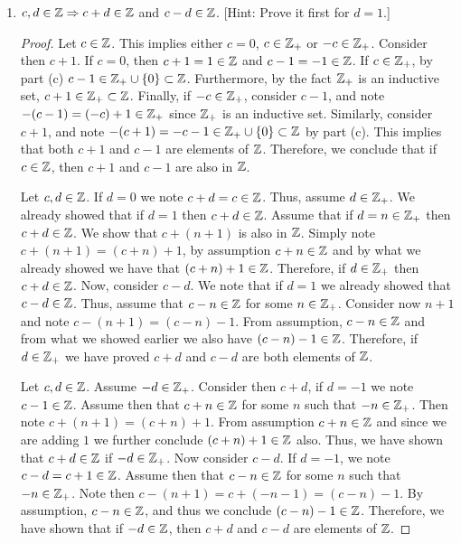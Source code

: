 \documentclass[12pt]{article}
\begin{document}
\begin{enumerate}[label=(\alph*)]
\begin{proof}
			Therefore, if $a \in \ZZ_{+}$, it must be $a \in X$. Thus, for $a \in \ZZ_{+}$ we conclude
			$a - 1 \in \ZZ_{+} \cup \{0\}$. 
		\end{proof}
		\item $c, d \in \mathbb{Z} \Rightarrow c + d \in \mathbb{Z}$ and $c - d \in \mathbb{Z}$. [Hint: Prove it first for $d = 1$.]
		\begin{proof}
			Let $c \in \mathbb{Z}$. This implies either $c = 0$, $c \in \mathbb{Z}_{+}$ or $-c \in \mathbb{Z}_{+}$.
			Consider then $c + 1$. If $c = 0$, then $c + 1 = 1 \in \mathbb{Z}$ and $c - 1 = -1 \in \mathbb{Z}$. 
			If $c \in \mathbb{Z}_{+}$, by part (c) $c - 1 \in \mathbb{Z}_{+} \cup \{0\} \subset \mathbb{Z}$. Furthermore, by the 
			fact $\mathbb{Z}_{+}$ is an inductive set, $c + 1 \in \mathbb{Z}_{+} \subset \mathbb{Z}$. Finally, if $-c \in \mathbb{Z}_{+}$,
			consider $c - 1$, and note $-(c - 1) = (-c) + 1 \in \mathbb{Z}_{+}$ since $\mathbb{Z}_{+}$ is an inductive
			set. Similarly, consider $c + 1$, and note $-(c + 1) = -c - 1 \in \mathbb{Z}_{+} \cup \{0\} \subset \mathbb{Z}$
			by part (c). This implies that both $c + 1$ and $c - 1$ are elements of $\mathbb{Z}$.
			Therefore, we conclude that if $c \in \mathbb{Z}$, then $c + 1$ and $c - 1$ are also in $\mathbb{Z}$.
			
			Let $c, d \in \mathbb{Z}$. If $d = 0$ we note $c + d = c \in \mathbb{Z}$. Thus, assume $d \in \mathbb{Z}_{+}$.
			We already showed that if $d = 1$ then $c + d \in \mathbb{Z}$. Assume that if $d = n \in \mathbb{Z}_{+}$
			then $c + d \in \mathbb{Z}$. We show that $c + (n + 1)$ is also in $\mathbb{Z}$. Simply note 
			$c + (n + 1) = (c + n) + 1$, by assumption $c + n \in \mathbb{Z}$ and by what we already showed
			we have that $(c + n) + 1 \in \mathbb{Z}$. Therefore, if $d \in \mathbb{Z}_{+}$ then $c + d \in \mathbb{Z}$.
			Now, consider $c - d$. We note that if $d=1$ we already showed that $c - d \in \mathbb{Z}$. Thus,
			assume that $c - n \in \mathbb{Z}$ for some $n \in \mathbb{Z}_{+}$. Consider now $n + 1$ and note
			$c - (n + 1) = (c - n) - 1$. From assumption, $c - n \in \mathbb{Z}$ and from what we showed earlier
			we also have $(c - n) - 1 \in \mathbb{Z}$. Therefore, if $d \in \mathbb{Z}_{+}$ we have proved 
			$c + d$ and $c - d$ are both elements of $\mathbb{Z}$.
			
			Let $c, d \in \mathbb{Z}$. Assume $-d \in \mathbb{Z}_{+}$. Consider then $c + d$, if $d = -1$ we note 
			$c - 1 \in \mathbb{Z}$. Assume then that $c + n \in \mathbb{Z}$ for some $n$ such that $-n \in \mathbb{Z}_{+}$.
			Then note $c + (n + 1) = (c + n) + 1$. From assumption $c + n \in \mathbb{Z}$ and since we are 
			adding $1$ we further conclude $(c + n) + 1 \in \mathbb{Z}$ also. Thus, we have shown that 
			$c + d \in \mathbb{Z}$ if $-d \in \mathbb{Z}_{+}$.
			Now consider $c - d$. If $d = -1$, we note $c - d = c + 1 \in \mathbb{Z}$. Assume then that 
			$c - n \in \mathbb{Z}$ for some $n$ such that $-n \in \mathbb{Z}_{+}$. Note then $c - (n + 1) = 
			c + (-n - 1) = (c - n) - 1$. By assumption, $c - n \in \mathbb{Z}$, and thus we conclude
			$(c - n) - 1 \in \mathbb{Z}$. Therefore, we have shown that if $-d \in \mathbb{Z}$, then 
			$c + d$ and $c - d$ are elements of $\mathbb{Z}$.
			

\end{proof}
\end{enumerate}
\end{document}
